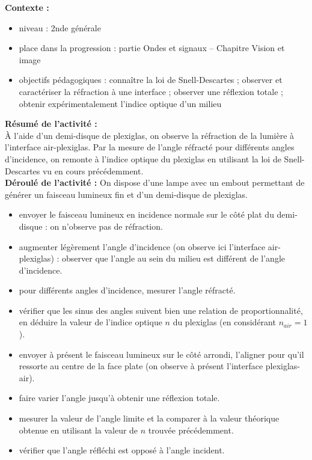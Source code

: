 \documentclass[a4paper,11pt]{article} %
\newenvironment{encart}[1]{%
	\begin{tcolorbox}
		[
		breakable, enhanced jigsaw, %
		arc = 1mm, %
		title = \textbf{#1}, %
		coltitle = white, %
		colbacktitle = blue, %
		colback = white, %
		colframe = blue %
		]
}{		
	\end{tcolorbox}
}
\begin{document}
	
	\begin{encart}{Activité pédagogique 2 : réfraction à une interface -- Loi de Snell-Descartes}
		\textbf{Contexte :}
		\begin{itemize}
			\item niveau : 2nde générale
			\item place dans la progression : partie Ondes et signaux -- Chapitre Vision et image
			\item objectifs pédagogiques : connaître la loi de Snell-Descartes ; observer et caractériser la réfraction à une interface ; observer une réflexion totale ; obtenir expérimentalement l'indice optique d'un milieu
		\end{itemize}
		\vspace{0.5cm}
		
		\textbf{Résumé de l'activité :}\\
		\`A l'aide d'un demi-disque de plexiglas, on observe la réfraction de la lumière à l'interface air-plexiglas. Par la mesure de l'angle réfracté pour différents angles d'incidence, on remonte à l'indice optique du plexiglas en utilisant la loi de Snell-Descartes vu en cours précédemment.\\
		
		\textbf{Déroulé de l'activité :}
		On dispose d'une lampe avec un embout permettant de générer un faisceau lumineux fin et d'un demi-disque de plexiglas.
		\begin{itemize}
			\item envoyer le faisceau lumineux en incidence normale sur le côté plat du demi-disque : on n'observe pas de réfraction.
			\item augmenter légèrement l'angle d'incidence (on observe ici l'interface air-plexiglas) : observer que l'angle au sein du milieu est différent de l'angle d'incidence.
			\item pour différents angles d'incidence, mesurer l'angle réfracté.
			\item vérifier que les sinus des angles suivent bien une relation de proportionnalité, en déduire la valeur de l'indice optique $ n $ du plexiglas (en considérant $ n_{air} = 1 $).
			\item envoyer à présent le faisceau lumineux sur le côté arrondi, l'aligner pour qu'il ressorte au centre de la face plate (on observe à présent l'interface plexiglas-air).
			\item faire varier l'angle  jusqu'à obtenir une réflexion totale.
			\item mesurer la valeur de l'angle limite et la comparer à la valeur théorique obtenue en utilisant la valeur de $ n $ trouvée précédemment.
			\item vérifier que l'angle réfléchi est opposé à l'angle incident.
		\end{itemize}
		
	\end{encart}
\end{document}
